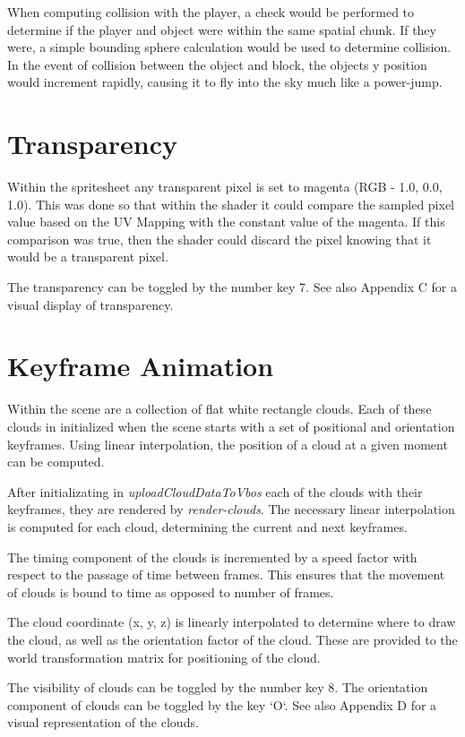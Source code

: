 \documentclass{book}
\begin{document}
When computing collision with the player, a check would be performed to determine if the player and object were within the same spatial chunk.  If they were, a simple bounding sphere calculation would be used to determine collision.  In the event of collision between the object and block, the objects y position would increment rapidly, causing it to fly into the sky much like a power-jump.  
    
\section{Transparency}
    
Within the spritesheet any transparent pixel is set to magenta (RGB - 1.0, 0.0, 1.0).  This was done so that within the shader it could compare the sampled pixel value based on the UV Mapping with the constant value of the magenta.  If this comparison was true, then the shader could discard the pixel knowing that it would be a transparent pixel.
    
The transparency can be toggled by the number key 7.  See also Appendix C for a visual display of transparency.
    
\section{Keyframe Animation}
    
Within the scene are a collection of flat white rectangle clouds.  Each of these clouds in initialized when the scene starts with a set of positional and orientation keyframes.  Using linear interpolation, the position of a cloud at a given moment can be computed.
    
After initializating in \textit{uploadCloudDataToVbos} each of the clouds with their keyframes, they are rendered by \textit{render-clouds}.  The necessary linear interpolation is computed for each cloud, determining the current and next keyframes.
    
The timing component of the clouds is incremented by a speed factor with respect to the passage of time between frames.  This ensures that the movement of clouds is bound to time as opposed to number of frames.  
    
The cloud coordinate (x, y, z) is linearly interpolated to determine where to draw the cloud, as well as the orientation factor of the cloud.  These are provided to the world transformation matrix for positioning of the cloud.
    
The visibility of clouds can be toggled by the number key 8.  The orientation component of clouds can be toggled by the key `O`.  See also Appendix D for a visual representation of the clouds.
    
\end{document}
